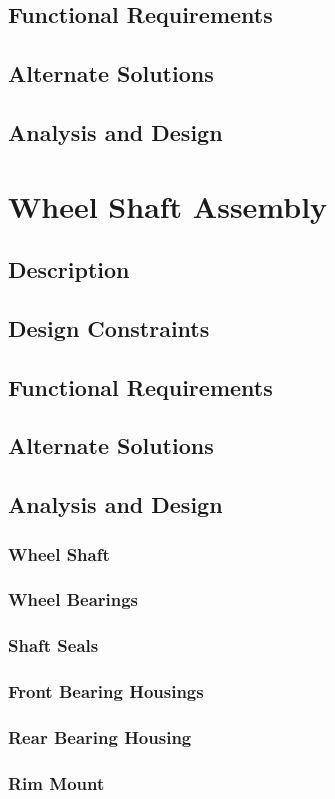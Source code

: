 \subsection{Functional Requirements}
\subsection{Alternate Solutions}
\subsection{Analysis and Design}

\section{Wheel Shaft Assembly}
\subsection{Description}
\subsection{Design Constraints}
\subsection{Functional Requirements}
\subsection{Alternate Solutions}
\subsection{Analysis and Design}
\subsubsection{Wheel Shaft}
\subsubsection{Wheel Bearings}
\subsubsection{Shaft Seals}
\subsubsection{Front Bearing Housings}
\subsubsection{Rear Bearing Housing}
\subsubsection{Rim Mount}